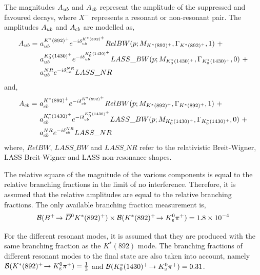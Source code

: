 The magnitudes $A_{{u}{b}}$ and $A_{{c}{b}}$ represent the amplitude of the suppressed and favoured  decays, where $X^-$ represents a resonant or non-resonant \KS\pim pair. The amplitudes $A_{{u}{b}}$ and $A_{{c}{b}}$ are modelled as,
\begin{align*}
A_{\uquark\bquark} =\ & a_{\uquark\bquark}^{K^*(892)^+}e^{-i\delta_{\uquark\bquark}^{K^*(892)^+}}RelBW(p;M_{K^*(892)^+},\Gamma_{K^*(892)^+},1)\ + \\
& a_{\uquark\bquark}^{K^*_0(1430)^+}e^{-i\delta_{\uquark\bquark}^{K^*_0(1430)^+}}LASS\_BW(p;M_{K^*_0(1430)^+},\Gamma_{K^*_0(1430)^+},0)\ + \\
& a_{\uquark\bquark}^{NR}e^{-i\delta_{\uquark\bquark}^{NR}}LASS\_NR
\end{align*}
and,
\begin{align*}
A_{\cquark\bquark} =\ & a_{\cquark\bquark}^{K^*(892)^+}e^{-i\delta_{\cquark\bquark}^{K^*(892)^+}}RelBW(p;M_{K^*(892)^+},\Gamma_{K^*(892)^+},1)\ + \\
& a_{\cquark\bquark}^{K^*_0(1430)^+}e^{-i\delta_{\cquark\bquark}^{K^*_0(1430)^+}}LASS\_BW(p;M_{K^*_0(1430)^+},\Gamma_{K^*_0(1430)^+},0)\ + \\
& a_{\cquark\bquark}^{NR}e^{-i\delta_{\cquark\bquark}^{NR}}LASS\_NR
\end{align*}
where, $RelBW$, $LASS\_BW$ and $LASS\_NR$ refer to the relativistic Breit-Wigner, LASS Breit-Wigner and LASS non-resonance shapes.%

The relative square of the magnitude of the various components is equal to the relative branching fractions in the limit of no interference. Therefore, it is assumed that the relative amplitudes are equal to the relative branching fractions. The only available branching fraction measurement is,
\begin{equation*}
{\ensuremath{\mathcal{B}}}({{{B}^+}}\!\rightarrow {\ensuremath{{\kern 0.2em\overline{\kern -0.2em D}{}}{}^0}} K^*(892)^+) \times {\ensuremath{\mathcal{B}}}(K^*(892)^+\!\rightarrow {\ensuremath{{K}^0_{\mathrm{ \scriptscriptstyle S}}}}{\ensuremath{{\pi}^+}}) = 1.8 \times 10^{-4}
\end{equation*}

For the different resonant \Kstarp modes, it is assumed that they are produced with the same branching fraction as the $K^*(892)$ mode. The branching fractions of different resonant \Kstarp modes to the \KS\pip final state are also taken into account, namely ${\mathcal{B}}(K^*(892)^+\!\rightarrow {\ensuremath{{K}^0_{\mathrm{ \scriptscriptstyle S}}}}{\ensuremath{{\pi}^+}}) = \frac{1}{3}$ and ${\mathcal{B}}(K^*_0(1430)^+\!\rightarrow {\ensuremath{{K}^0_{\mathrm{ \scriptscriptstyle S}}}}{\ensuremath{{\pi}^+}}) = 0.31$.

